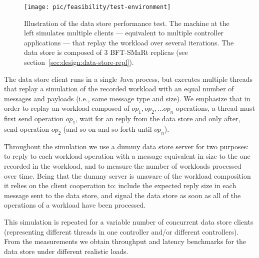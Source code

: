 \begin{figure}
  \centering
\texttt{[image: pic/feasibility/test-environment]}   \caption[Test Environment and Metholodogy.]{Illustration of the data store performance test. The machine at the left simulates multiple clients --- equivalent to multiple controller applications --- that replay the workload over several iterations. The data store is composed of 3 BFT-SMaRt replicas (see section~\ref{sec:design:data-store-repl}).} 
  \label{fig:feasibility:simulation}
\end{figure}


The data store client runs in a single Java process, but executes multiple threads that replay a simulation of the recorded workload with an equal number of messages and payloads (i.e., same message type and size). 
We emphasize  that in order to replay an workload composed of $op_1,op_2,...op_n$ operations, a thread must first send operation $op_1$, wait for an reply from the data store and only after, send operation $op_2$ (and so on and so forth until $op_n$). 

Throughout the simulation we use a dummy data store server for two purposes: to reply to each workload operation with a message equivalent in size to the one  recorded in the workload, and to measure the number of workloads processed over time. 
Being that the dummy server is unaware of the workload composition it relies on the client cooperation to: include the expected reply size in each message sent to the data store, and signal the data store as soon as all of the operations of a workload have been processed. 





This simulation is repeated for a variable number of concurrent data store clients (representing different threads in one controller and/or different controllers). 
From the measurements we obtain throughput and latency benchmarks for the data store under different realistic loads. 

